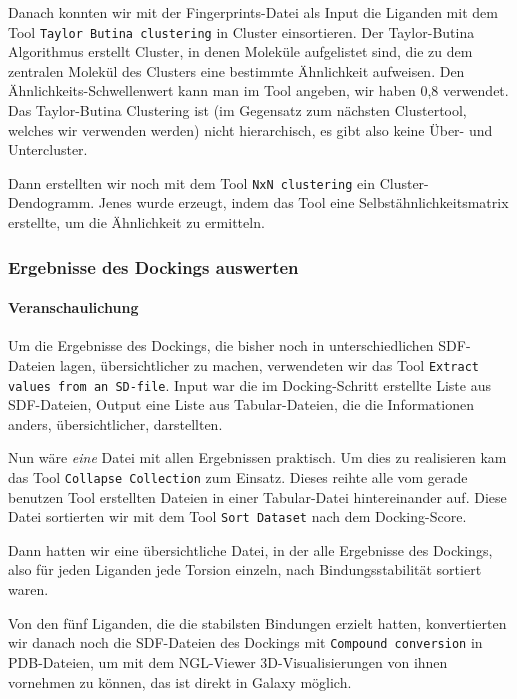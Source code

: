 \documentclass[10pt]{article}
\begin{document}
    Danach konnten wir mit der Fingerprints-Datei als Input die Liganden mit dem Tool \texttt{Taylor Butina
    clustering} in
    Cluster einsortieren.\cite{6} Der Taylor-Butina Algorithmus erstellt Cluster, in denen Moleküle aufgelistet
    sind, die zu
    dem zentralen Molekül des Clusters eine bestimmte Ähnlichkeit aufweisen. Den Ähnlichkeits-Schwellenwert kann man
    im Tool angeben, wir haben 0,8 verwendet. Das Taylor-Butina Clustering ist (im Gegensatz zum nächsten
    Clustertool, welches wir verwenden werden) nicht hierarchisch, es gibt also keine Über- und Untercluster.

    Dann erstellten wir noch mit dem Tool \texttt{NxN clustering} ein Cluster-Dendogramm. Jenes wurde erzeugt, indem das
    Tool eine Selbstähnlichkeitsmatrix erstellte, um die Ähnlichkeit zu ermitteln.

    \subsubsection{Ergebnisse des Dockings auswerten}
    \paragraph{Veranschaulichung}
    Um die Ergebnisse des Dockings, die bisher noch in unterschiedlichen SDF-Dateien lagen, übersichtlicher zu
    machen, verwendeten wir das Tool \texttt{Extract values from an SD-file}. Input war die im Docking-Schritt erstellte
    Liste aus SDF-Dateien, Output eine Liste aus Tabular-Dateien, die die Informationen anders, übersichtlicher,
    darstellten.

    Nun wäre \emph{eine} Datei mit allen Ergebnissen praktisch. Um dies zu realisieren kam das Tool \texttt{Collapse
    Collection}
    zum Einsatz. Dieses reihte alle vom gerade benutzen Tool erstellten Dateien in einer Tabular-Datei hintereinander
    auf. Diese Datei sortierten wir mit dem Tool \texttt{Sort Dataset} nach dem Docking-Score.

    Dann hatten wir eine übersichtliche Datei, in der alle Ergebnisse des Dockings, also für jeden Liganden jede
    Torsion einzeln, nach Bindungsstabilität sortiert waren.

    Von den fünf Liganden, die die stabilsten Bindungen erzielt hatten, konvertierten wir danach noch die SDF-Dateien
    des Dockings mit \texttt{Compound conversion} in PDB-Dateien, um mit dem NGL-Viewer 3D-Visualisierungen von ihnen
    vornehmen zu können, das ist direkt in Galaxy möglich.\cite{19}
\end{document}
